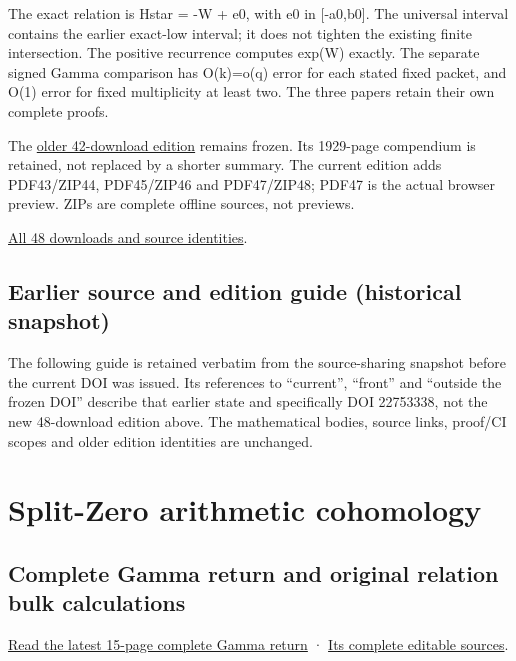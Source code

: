 \documentclass[
]{article}
\begin{document}
The exact relation is Hstar = -W + e0, with e0 in {[}-a0,b0{]}. The
universal interval contains the earlier exact-low interval; it does not
tighten the existing finite intersection. The positive recurrence
computes exp(W) exactly. The separate signed Gamma comparison has
O(k)=o(q) error for each stated fixed packet, and O(1) error for fixed
multiplicity at least two. The three papers retain their own complete
proofs.

The \href{https://doi.org/10.5281/zenodo.22753338}{older 42-download
edition} remains frozen. Its 1929-page compendium is retained, not
replaced by a shorter summary. The current edition adds PDF43/ZIP44,
PDF45/ZIP46 and PDF47/ZIP48; PDF47 is the actual browser preview. ZIPs
are complete offline sources, not previews.

\href{calculation_edition_20260914_gamma_return/README.md}{All 48
downloads and source identities}.

\subsection{Earlier source and edition guide (historical
snapshot)}\label{earlier-source-and-edition-guide-historical-snapshot-21}

The following guide is retained verbatim from the source-sharing
snapshot before the current DOI was issued. Its references to
``current'', ``front'' and ``outside the frozen DOI'' describe that
earlier state and specifically DOI 22753338, not the new 48-download
edition above. The mathematical bodies, source links, proof/CI scopes
and older edition identities are unchanged.

\section{Split-Zero arithmetic
cohomology}\label{split-zero-arithmetic-cohomology}

\subsection{Complete Gamma return and original relation bulk
calculations}\label{complete-gamma-return-and-original-relation-bulk-calculations}

\href{workbenches/splitzero-tandem/continuations/20260914-complete-gamma-return/Complete_Gamma_Return.pdf}{Read
the latest 15-page complete Gamma return} ·
\href{workbenches/splitzero-tandem/continuations/20260914-complete-gamma-return/README.md}{Its
complete editable sources}.
\end{document}
